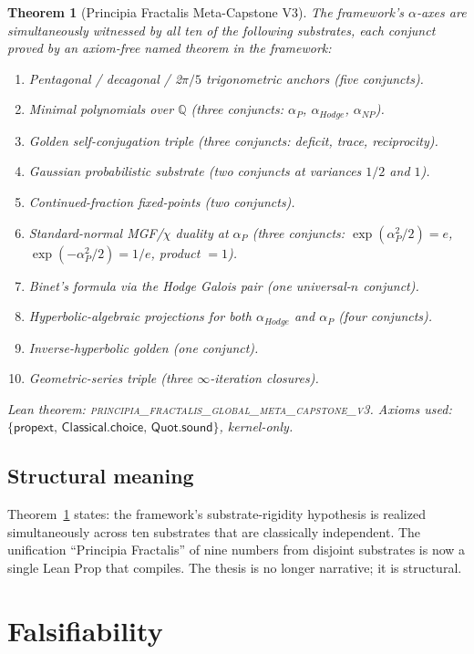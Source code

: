 \documentclass[11pt,a4paper]{amsart}
\theoremstyle{plain}
\newtheorem{theorem}{Theorem}[section]
\theoremstyle{definition}
\newcommand{\Qr}{\mathbb{Q}}
\newcommand{\aP}{\alpha_{P}}
\newcommand{\aNP}{\alpha_{NP}}
\newcommand{\aHodge}{\alpha_{Hodge}}
\newcommand{\kernelaxioms}{\{\mathsf{propext},\,\mathsf{Classical.choice},\,\mathsf{Quot.sound}\}}
\begin{document}
\begin{theorem}[Principia Fractalis Meta-Capstone V3]
\label{thm:metacap3}
The framework's $\alpha$-axes are simultaneously witnessed by all ten
of the following substrates, each conjunct proved by an axiom-free
named theorem in the framework:
\begin{enumerate}[label=(\roman*)]
\item Pentagonal / decagonal / 2$\pi/5$ trigonometric anchors
(five conjuncts).
\item Minimal polynomials over $\Qr$
(three conjuncts: $\aP$, $\aHodge$, $\aNP$).
\item Golden self-conjugation triple
(three conjuncts: deficit, trace, reciprocity).
\item Gaussian probabilistic substrate
(two conjuncts at variances $1/2$ and $1$).
\item Continued-fraction fixed-points
(two conjuncts).
\item Standard-normal MGF/$\chi$ duality at $\aP$
(three conjuncts: $\exp(\aP^{2}/2) = e$,
$\exp(-\aP^{2}/2) = 1/e$, product $= 1$).
\item Binet's formula via the Hodge Galois pair
(one universal-$n$ conjunct).
\item Hyperbolic-algebraic projections for both $\aHodge$ and $\aP$
(four conjuncts).
\item Inverse-hyperbolic golden (one conjunct).
\item Geometric-series triple (three $\infty$-iteration closures).
\end{enumerate}
Lean theorem:
\textsc{principia\_fractalis\_global\_meta\_capstone\_v3}. Axioms used:
$\kernelaxioms$, kernel-only.
\end{theorem}

\subsection{Structural meaning}
Theorem~\ref{thm:metacap3} states: the framework's substrate-rigidity
hypothesis is realized simultaneously across ten substrates that are
classically independent. The unification ``Principia Fractalis''
of nine numbers from disjoint substrates is now a single Lean Prop
that compiles. The thesis is no longer narrative; it is structural.

\section{Falsifiability}
\label{sec:falsify}
\end{document}
